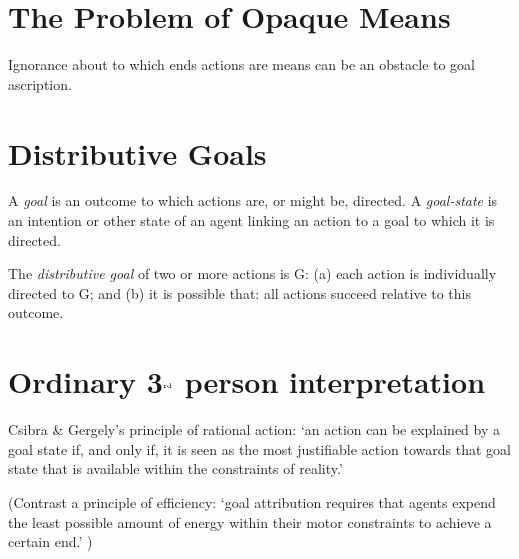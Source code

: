 \documentclass[11pt]{extarticle}
\begin{document}
\begin{multicols}{3}
\section{The Problem of Opaque Means}
Ignorance about to which ends actions are means can be an obstacle to goal ascription.

\section{Distributive Goals}
A \emph{goal} is an outcome to which actions are, or might be, directed.  A \emph{goal-state} is an intention or other state of an agent linking an action to a goal to which it is directed.


The \emph{distributive goal} of two or more actions is G: (a) each action is individually directed to G; and (b) it is possible that: all actions succeed relative to this outcome.




\section{Ordinary 3$^{\textrm{\tiny rd}}$ person interpretation} 

Csibra \& Gergely's principle of rational action: `an action can be explained by a goal state if, and only if, it is seen as the most justifiable action towards that goal state that is available within the constraints of reality.'\citep{Csibra:1998cx,Csibra:2003jv}

(Contrast a principle of efficiency:
`goal attribution requires that agents expend the least possible amount of energy within their motor constraints to achieve a certain end.' \citep%
{Southgate:2008el})

%




\end{multicols}
\end{document}
